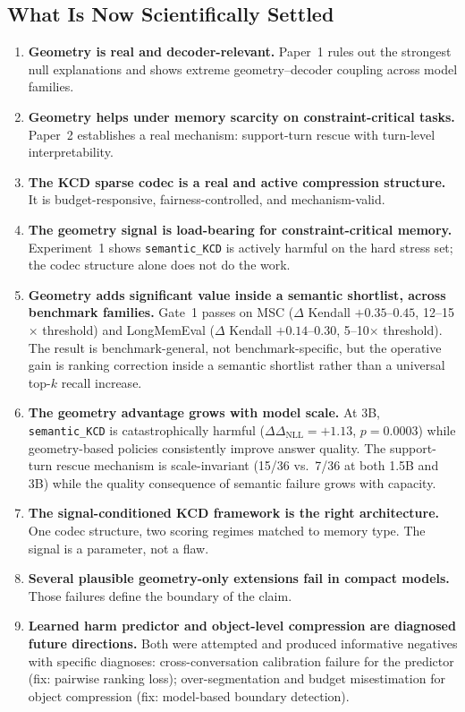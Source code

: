 \documentclass[conference]{IEEEtran}
\newcommand{\NLL}{\Delta_{\mathrm{NLL}}}
\begin{document}
\subsection{What Is Now Scientifically Settled}
\begin{enumerate}[leftmargin=1.4em]
    \item \textbf{Geometry is real and decoder-relevant.} Paper~1 rules out the strongest null explanations and shows extreme geometry--decoder coupling across model families.
    \item \textbf{Geometry helps under memory scarcity on constraint-critical tasks.} Paper~2 establishes a real mechanism: support-turn rescue with turn-level interpretability.
    \item \textbf{The KCD sparse codec is a real and active compression structure.} It is budget-responsive, fairness-controlled, and mechanism-valid.
    \item \textbf{The geometry signal is load-bearing for constraint-critical memory.} Experiment~1 shows \texttt{semantic\_KCD} is actively harmful on the hard stress set; the codec structure alone does not do the work.
    \item \textbf{Geometry adds significant value inside a semantic shortlist, across benchmark families.} Gate~1 passes on MSC ($\Delta$ Kendall $+0.35$--$0.45$, 12--15$\times$ threshold) and LongMemEval ($\Delta$ Kendall $+0.14$--$0.30$, 5--10$\times$ threshold). The result is benchmark-general, not benchmark-specific, but the operative gain is ranking correction inside a semantic shortlist rather than a universal top-$k$ recall increase.
    \item \textbf{The geometry advantage grows with model scale.} At 3B, \texttt{semantic\_KCD} is catastrophically harmful ($\Delta\NLL = +1.13$, $p=0.0003$) while geometry-based policies consistently improve answer quality. The support-turn rescue mechanism is scale-invariant (15/36 vs.\ 7/36 at both 1.5B and 3B) while the quality consequence of semantic failure grows with capacity.
    \item \textbf{The signal-conditioned KCD framework is the right architecture.} One codec structure, two scoring regimes matched to memory type. The signal is a parameter, not a flaw.
    \item \textbf{Several plausible geometry-only extensions fail in compact models.} Those failures define the boundary of the claim.
    \item \textbf{Learned harm predictor and object-level compression are diagnosed future directions.} Both were attempted and produced informative negatives with specific diagnoses: cross-conversation calibration failure for the predictor (fix: pairwise ranking loss); over-segmentation and budget misestimation for object compression (fix: model-based boundary detection).
\end{enumerate}
\end{document}
